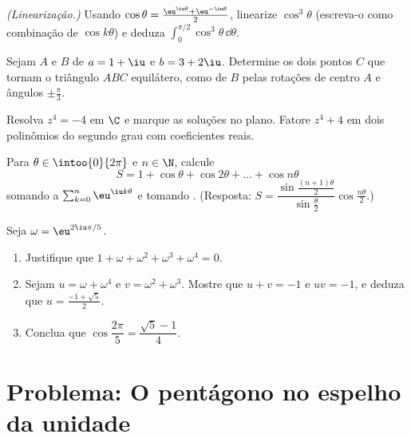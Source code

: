 \begin{exercise}[$\star\star$]\label{exo:g12:complex:6}
\emph{(Linearização.)} Usando
$\cos\theta = \frac{\eu^{\iu\theta} + \eu^{-\iu\theta}}{2}$, linearize
$\cos^3\theta$ (escreva-o como combinação de $\cos k\theta$) e deduza
$\displaystyle\int_0^{\pi/2}\cos^3\theta\,\dd\theta$.
\end{exercise}

\begin{exercise}[$\star\star$]\label{exo:g12:complex:7}
Sejam $A$ e $B$ de  $a = 1 + \iu$ e $b = 3 + 2\iu$. Determine os dois
pontos $C$ que tornam o triângulo $ABC$ equilátero, como  de $B$
pelas rotações de centro $A$ e ângulos $\pm\frac{\pi}{3}$.
\end{exercise}

\begin{exercise}[$\star\star\star$]\label{exo:g12:complex:8}
Resolva $z^4 = -4$ em $\C$ e marque as soluções no plano. Fatore
$z^4 + 4$ em dois polinômios do segundo grau com coeficientes reais.
\end{exercise}

\begin{exercise}[$\star\star\star$]\label{exo:g12:complex:9}
Para $\theta \in \intoo{0}{2\pi}$ e $n \in \N$, calcule
\[
S = 1 + \cos\theta + \cos 2\theta + \dots + \cos n\theta
\]
somando a  $\sum_{k=0}^n \eu^{\iu k\theta}$ e tomando
. (Resposta:
$S = \dfrac{\sin\frac{(n+1)\theta}{2}}{\sin\frac{\theta}{2}}
\cos\frac{n\theta}{2}$.)
\end{exercise}

\begin{exercise}[$\star\star\star$]\label{exo:g12:complex:10}
Seja $\omega = \eu^{2\iu\pi/5}$.
\begin{enumerate}
  \item Justifique que $1 + \omega + \omega^2 + \omega^3 + \omega^4 = 0$.
  \item Sejam $u = \omega + \omega^4$ e $v = \omega^2 + \omega^3$. Mostre
        que $u + v = -1$ e $uv = -1$, e deduza que
        $u = \frac{-1+\sqrt5}{2}$.
  \item Conclua que
        $\cos\dfrac{2\pi}{5} = \dfrac{\sqrt5 - 1}{4}$.
\end{enumerate}
\end{exercise}

\section{Problema: O pentágono no espelho da unidade}

